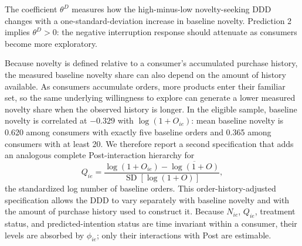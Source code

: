 \documentclass[11 pt]{article}
\begin{document}
The coefficient $\theta^D$ measures how the high-minus-low novelty-seeking DDD changes with a one-standard-deviation increase in baseline novelty. Prediction 2 implies $\theta^D>0$: the negative interruption response should attenuate as consumers become more exploratory.

Because novelty is defined relative to a consumer's accumulated purchase history, the measured baseline novelty share can also depend on the amount of history available. As consumers accumulate orders, more products enter their familiar set, so the same underlying willingness to explore can generate a lower measured novelty share when the observed history is longer. In the eligible sample, baseline novelty is correlated at $-0.329$ with $\log(1+O_{ie})$: mean baseline novelty is 0.620 among consumers with exactly five baseline orders and 0.365 among consumers with at least 20. We therefore report a second specification that adds an analogous complete Post-interaction hierarchy for
\[
Q_{ie}
=
\frac{\log(1+O_{ie})-\overline{\log(1+O)}}
{\operatorname{SD}[\log(1+O)]},
\]
the standardized log number of baseline orders. This order-history-adjusted specification allows the DDD to vary separately with baseline novelty and with the amount of purchase history used to construct it. Because $N_{ie}$, $Q_{ie}$, treatment status, and predicted-intention status are time invariant within a consumer, their levels are absorbed by $\phi_{ie}$; only their interactions with Post are estimable.
\end{document}
